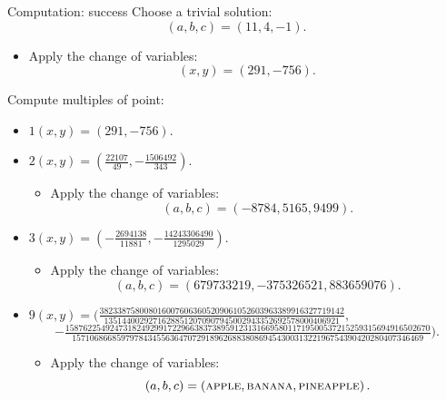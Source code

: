 \documentclass[8pt,t]{beamer}
\newcommand{\rb}[1]{\left( #1 \right)}
\begin{document}
\begin{frame}{Computation: success}
Choose a trivial solution:
$$ \rb{a, b, c} = \rb{11, 4, -1}. $$
\pause
\begin{itemize}
\item Apply the change of variables:
$$ \rb{x, y} = \rb{291, -756}. $$
\end{itemize}
\pause
Compute multiples of point:
\begin{itemize}
\item<4-> $ 1\rb{x, y} = \rb{291, -756} $.
\item<5-> $ 2\rb{x, y} = \rb{\tfrac{22107}{49}, -\tfrac{1506492}{343}} $.
\begin{itemize}
\item<6-> Apply the change of variables:
$$ \rb{a, b, c} = \rb{-8784, 5165, 9499}. $$
\end{itemize}
\item<7-> $ 3\rb{x, y} = \rb{-\tfrac{2694138}{11881}, -\tfrac{14243306490}{1295029}} $.
\begin{itemize}
\item<8-> Apply the change of variables:
$$ \rb{a, b, c} = \rb{679733219, -375326521, 883659076}. $$
\end{itemize}
\item<9-> $ 9\rb{x, y} = (\tfrac{3823387580080160076063605209061052603963389916327719142}{13514400292716288512070907945002943352692578000406921}, $
$$ -\tfrac{1587622549247318249299172296638373895912313166958011719500537215259315694916502670}{1571068668597978434556364707291896268838086945430031322196754390420280407346469}). $$
\begin{itemize}
\item<10-> Apply the change of variables:
$$ \rb{a, b, c} = \rb{\textsc{apple}, \textsc{banana}, \textsc{pineapple}}. $$
\end{itemize}
\end{itemize}
\end{frame}
\end{document}
